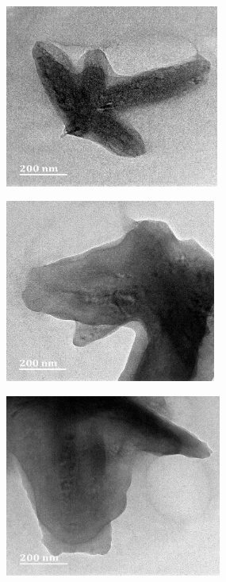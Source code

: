 \documentclass[12pt]{report}
\begin{document}
\begin{figure}[H]
\centering

\begin{subfigure}{.45\textwidth}
    \includegraphics[height=6cm, width=\textwidth]{diffraction_image_8.png}
\end{subfigure}
\hspace{-1em}
\begin{subfigure}{.45\textwidth}
    \includegraphics[height=6cm, width=\textwidth]{diffraction_image_9.png}
\end{subfigure}
\par\bigskip
\begin{subfigure}{.45\textwidth}
    \includegraphics[height=6cm, width=\textwidth]{diffraction_image_10.png}
\end{subfigure}

\end{figure}
\end{document}
